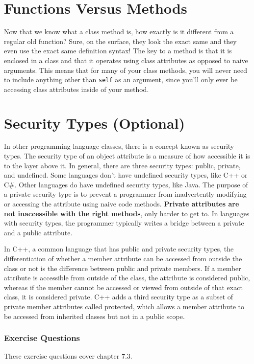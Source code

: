 \section{Functions Versus Methods}
Now that we know what a class method is, how exactly is it different from a regular old function? Sure, on the surface, they look the exact same and they even use the exact same definition syntax! The key to a method is that it is enclosed in a class and that it operates using class attributes as opposed to naive arguments. This means that for many of your class methods, you will never need to include anything other than \verb|self| as an argument, since you'll only ever be accessing class attributes inside of your method. 
\section{Security Types (Optional)}
In other programming language classes, there is a concept known as security types. The security type of an object attribute is a measure of how accessible it is to the layer above it. In general, there are three security types: public, private, and undefined. Some languages don't have undefined security types, like C++ or C\#. Other languages do have undefined security types, like Java. The purpose of a private security type is to prevent a programmer from inadvertently modifying or accessing the attribute using naive code methods. \textbf{Private attributes are not inaccessible with the right methods}, only harder to get to. In languages with security types, the programmer typically writes a bridge between a private and a public attribute.\par
In C++, a common language that has public and private security types, the differentiation of whether a member attribute can be accessed from outside the class or not is the difference between public and private members. If a member attribute is accessible from outside of the class, the attribute is considered public, whereas if the member cannot be accessed or viewed from outside of that exact class, it is considered private. C++ adds a third security type as a subset of private member attributes called protected, which allows a member attribute to be accessed from inherited classes but not in a public scope.\par
\subsubsection*{Exercise Questions}
These exercise questions cover chapter 7.3.

